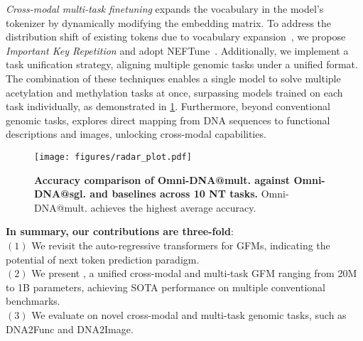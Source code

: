 \textit{Cross-modal multi-task finetuning} expands the vocabulary in the model's tokenizer by dynamically modifying the embedding matrix. To address the distribution shift of existing tokens due to vocabulary expansion~\cite{hewitt2021initializing}, we propose \textit{Important Key Repetition} and adopt NEFTune~\cite{jain2023neftune}. Additionally, we implement a task unification strategy, aligning multiple genomic tasks under a unified format. The combination of these techniques enables a single model to solve multiple acetylation and methylation tasks at once, surpassing models trained on each task individually, as demonstrated in \cref{fig:multi-tasking}. Furthermore, beyond conventional genomic tasks, \method explores direct mapping from DNA sequences to functional descriptions and images, unlocking cross-modal capabilities.

\begin{figure}[ht!]
    \centering
    \texttt{[image: figures/radar\_plot.pdf]}
     \vspace{-1em} %
    \caption{\textbf{Accuracy comparison of Omni-DNA@mult. against Omni-DNA@sgl. and baselines across 10 NT tasks.} Omni-DNA@mult. achieves the highest average accuracy.}%
    \label{fig:multi-tasking}
    \vspace{-1em}
\end{figure}


\textbf{In summary, our contributions are three-fold}: \\
\noindent $(1)$  We revisit the auto-regressive transformers for GFMs, indicating the potential of next token prediction paradigm.  \\
\noindent$(2)$  We present \method, a unified cross-modal and multi-task GFM ranging from 20M to 1B parameters, achieving SOTA performance on multiple conventional benchmarks.\\ 
\noindent$(3)$ We evaluate \method on novel cross-modal and multi-task genomic tasks, such as DNA2Func and DNA2Image.





